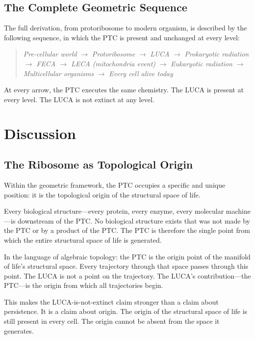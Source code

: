 \documentclass[11pt]{article}
\theoremstyle{definition}
\begin{document}
\subsection{The Complete Geometric Sequence}

The full derivation, from protoribosome to modern organism,
is described by the following sequence, in which the PTC
is present and unchanged at every level:

\begin{quote}
\textit{Pre-cellular world} $\to$
\textit{Protoribosome} $\to$
\textit{LUCA} $\to$
\textit{Prokaryotic radiation} $\to$
\textit{FECA $\to$ LECA (mitochondria event)} $\to$
\textit{Eukaryotic radiation} $\to$
\textit{Multicellular organisms} $\to$
\textit{Every cell alive today}
\end{quote}

At every arrow, the PTC executes the same chemistry.
The LUCA is present at every level.
The LUCA is not extinct at any level.

\section{Discussion}

\subsection{The Ribosome as Topological Origin}

Within the geometric framework, the PTC occupies a specific
and unique position: it is the topological origin of the
structural space of life.

Every biological structure---every protein, every enzyme,
every molecular machine---is downstream of the PTC.
No biological structure exists that was not made by the PTC
or by a product of the PTC.
The PTC is therefore the single point from which the entire
structural space of life is generated.

In the language of algebraic topology: the PTC is the origin
point of the manifold of life's structural space.
Every trajectory through that space passes through this point.
The LUCA is not a point on the trajectory.
The LUCA's contribution---the PTC---is the origin from which
all trajectories begin.

This makes the LUCA-is-not-extinct claim stronger than a
claim about persistence.
It is a claim about origin.
The origin of the structural space of life is still present
in every cell.
The origin cannot be absent from the space it generates.
\end{document}
